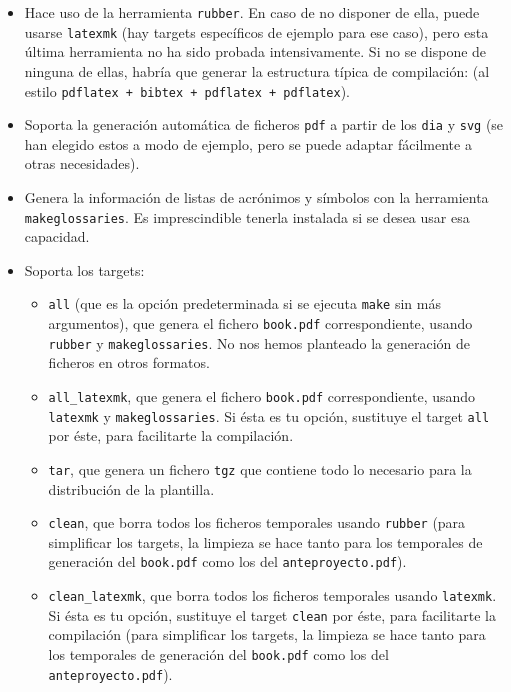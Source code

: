\documentclass[spanish,openright]{book}
\begin{document}
\begin{itemize}

\item Hace uso de la herramienta \texttt{rubber}. En caso de no disponer
de ella, puede usarse \texttt{latexmk} (hay targets específicos de
ejemplo para ese caso), pero esta última herramienta no ha sido
probada intensivamente. Si no se dispone de ninguna de ellas, habría
que generar la estructura típica de compilación: (al estilo
\texttt{pdflatex + bibtex + pdflatex + pdflatex}).
\item Soporta la generación automática de ficheros \texttt{pdf} a partir
de los \texttt{dia} y \texttt{svg} (se han elegido estos a modo de
ejemplo, pero se puede adaptar fácilmente a otras necesidades).
\item Genera la información de listas de acrónimos y símbolos con la
herramienta \texttt{makeglossaries}. Es imprescindible tenerla
instalada si se desea usar esa capacidad.
\item Soporta los targets:
\begin{itemize}
\item \texttt{all} (que es la opción predeterminada si se ejecuta
\texttt{make} sin más argumentos), que genera el fichero
\texttt{book.pdf} correspondiente, usando \texttt{rubber} y
\texttt{makeglossaries}. No nos hemos planteado la generación de
ficheros en otros formatos.
\item \texttt{all\_latexmk}, que genera el fichero \texttt{book.pdf}
correspondiente, usando \texttt{latexmk} y
\texttt{makeglossaries}. Si ésta  es tu opción, sustituye el target
\texttt{all} por éste, para facilitarte la compilación.

\item  \texttt{tar}, que genera un fichero \texttt{tgz} que contiene
todo lo necesario para la distribución de la plantilla.
\item \texttt{clean}, que borra todos los ficheros temporales usando
\texttt{rubber} (para simplificar los targets, la limpieza se hace
tanto para los temporales de generación del \texttt{book.pdf} como
los del \texttt{anteproyecto.pdf}).
\item \texttt{clean\_latexmk}, que borra todos los ficheros temporales
usando \texttt{latexmk}. Si ésta es tu opción, sustituye el target
\texttt{clean} por éste, para facilitarte la compilación (para
simplificar los targets, la limpieza se hace tanto para los
temporales de generación del \texttt{book.pdf} como los del
\texttt{anteproyecto.pdf}).


\end{itemize}
\end{itemize}
\end{document}

